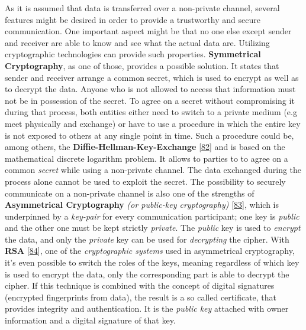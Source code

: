 \documentclass[12pt,english,a4paper,titlepage,cleardoublepage=empty,dottedtoc]{report}
\begin{document}
As it is assumed that data is transferred over a non-private channel,
several features might be desired in order to provide a trustworthy and
secure communication. One important aspect might be that no one else
except sender and receiver are able to know and see what the actual data
are. Utilizing cryptographic technologies can provide such properties.
\textbf{Symmetrical Cryptography}, as one of those, provides a possible
solution. It states that sender and receiver arrange a common secret,
which is used to encrypt as well as to decrypt the data. Anyone who is
not allowed to access that information must not be in possession of the
secret. To agree on a secret without compromising it during that
process, both entities either need to switch to a private medium (e.g
meet physically and exchange) or have to use a procedure in which the
entire key is not exposed to others at any single point in time. Such a
procedure could be, among others, the
\textbf{Diffie-Hellman-Key-Exchange}
{[}\protect\hyperlink{ref-paper_1976_d-h-key-exchange}{82}{]} and is
based on the mathematical discrete logarithm problem. It allows to
parties to to agree on a common \emph{secret} while using a non-private
channel. The data exchanged during the process alone cannot be used to
exploit the secret. The possibility to securely communicate on a
non-private channel is also one of the strengths of
\textbf{\protect\hypertarget{def--asym-crypto}{}{Asymmetrical
Cryptography}} \emph{(or public-key cryptography)}
{[}\protect\hyperlink{ref-book_2014_chapter-9-1-public-key-crypto}{83}{]},
which is underpinned by a \emph{key-pair} for every communication
participant; one key is \emph{public} and the other one must be kept
strictly \emph{private}. The \emph{public} key is used to \emph{encrypt}
the data, and only the \emph{private} key can be used for
\emph{decrypting} the cipher. With \textbf{RSA}
{[}\protect\hyperlink{ref-web_spec_rsa}{84}{]}, one of the
\emph{cryptographic systems} used in asymmetrical cryptography, it's
even possible to switch the roles of the keys, meaning regardless of
which key is used to encrypt the data, only the corresponding part is
able to decrypt the cipher. If this technique is combined with the
concept of digital signatures (encrypted fingerprints from data), the
result is a so called certificate, that provides integrity and
authentication. It is the \emph{public key} attached with owner
information and a digital signature of that key.
\end{document}
